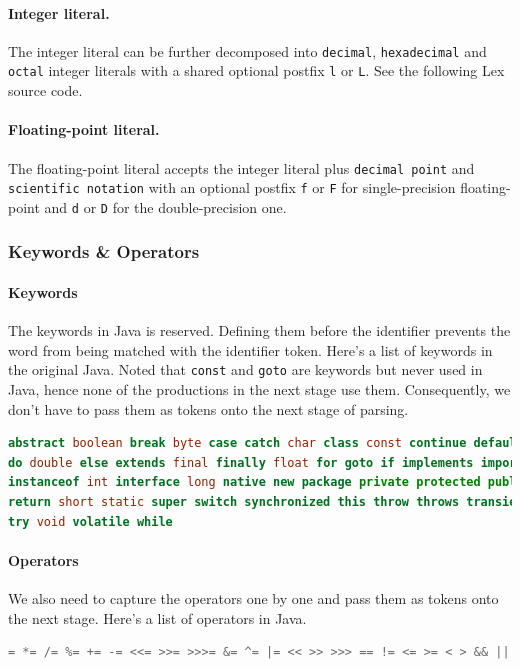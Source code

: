 \documentclass[12pt]{article}
\begin{document}
\paragraph{Integer literal.}
The integer literal can be further decomposed into \texttt{decimal}, \texttt{hexadecimal} and \texttt{octal} integer literals with a shared optional postfix \texttt{l} or \texttt{L}. See the following Lex source code.

\paragraph{Floating-point literal.}
The floating-point literal accepts the integer literal plus \texttt{decimal point} and \texttt{scientific notation} with an optional postfix \texttt{f} or \texttt{F} for single-precision floating-point and \texttt{d} or \texttt{D} for the double-precision one.


\subsubsection{Keywords \& Operators}
\paragraph{Keywords}
The keywords in Java is reserved. Defining them before the identifier prevents the word from being matched with the identifier token. Here's a list of keywords in the original Java. Noted that \texttt{const} and \texttt{goto} are keywords but never used in Java, hence none of the productions in the next stage use them. Consequently, we don't have to pass them as tokens onto the next stage of parsing.
\begin{lstlisting}[language=Java]
abstract boolean break byte case catch char class const continue default 
do double else extends final finally float for goto if implements import 
instanceof int interface long native new package private protected public
return short static super switch synchronized this throw throws transient
try void volatile while
\end{lstlisting}
\paragraph{Operators}
We also need to capture the operators one by one and pass them as tokens onto the next stage. Here's a list of operators in Java.
\begin{lstlisting}[language=Java]
= *= /= %= += -= <<= >>= >>>= &= ^= |= << >> >>> == != <= >= < > && || ! ++ -- & | ^ ~ * / % + - ? : . { } [ ] ( ) , ;
\end{lstlisting}
\end{document}
